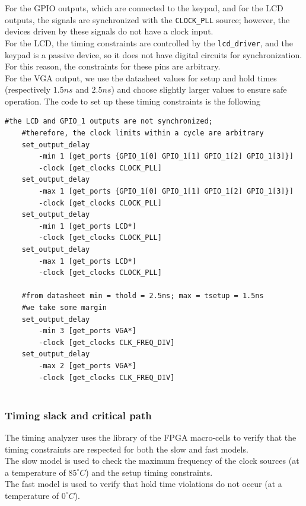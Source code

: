 \newpage
\noindent
For the GPIO outputs, which are connected to the keypad, and for the LCD outputs, the signals are synchronized with the \texttt{CLOCK\_PLL} source; however, the devices driven by these signals do not have a clock input. \\
For the LCD, the timing constraints are controlled by the \texttt{lcd\_driver}, and the keypad is a passive device, so it does not have digital circuits for synchronization. \\
For this reason, the constraints for these pins are arbitrary. \\
For the VGA output, we use the datasheet values for setup and hold times (respectively \(1.5ns\) and \(2.5ns\)) and choose slightly larger values to ensure safe operation.
The code to set up these timing constraints is the following

\vspace{0.5cm}
\begin{lstlisting}[language=sdc, caption=Setup synchronous paths]
    #the LCD and GPIO_1 outputs are not synchronized; 
    #therefore, the clock limits within a cycle are arbitrary
    set_output_delay 
        -min 1 [get_ports {GPIO_1[0] GPIO_1[1] GPIO_1[2] GPIO_1[3]}] 
        -clock [get_clocks CLOCK_PLL]
    set_output_delay 
        -max 1 [get_ports {GPIO_1[0] GPIO_1[1] GPIO_1[2] GPIO_1[3]}] 
        -clock [get_clocks CLOCK_PLL]
    set_output_delay 
        -min 1 [get_ports LCD*] 
        -clock [get_clocks CLOCK_PLL]
    set_output_delay 
        -max 1 [get_ports LCD*] 
        -clock [get_clocks CLOCK_PLL]
    
    #from datasheet min = thold = 2.5ns; max = tsetup = 1.5ns
    #we take some margin
    set_output_delay 
        -min 3 [get_ports VGA*] 
        -clock [get_clocks CLK_FREQ_DIV]
    set_output_delay 
        -max 2 [get_ports VGA*] 
        -clock [get_clocks CLK_FREQ_DIV]
    
\end{lstlisting}
\vspace{0.5cm}

\newpage
\subsubsection{Timing slack and critical path}
The timing analyzer uses the library of the FPGA macro-cells to verify that the timing constraints are respected for both the slow and fast models.\\
The slow model is used to check the maximum frequency of the clock sources (at a temperature of \(85^\circ C\)) and the setup timing constraints.\\
The fast model is used to verify that hold time violations do not occur (at a temperature of \(0^\circ C\)).

